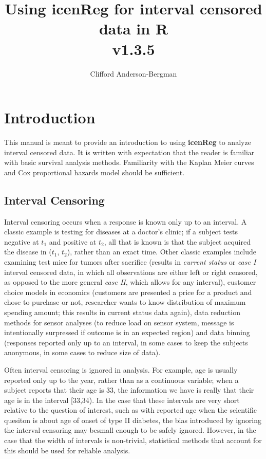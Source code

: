 \documentclass[a4paper]{article}
\begin{document}


\title{Using {\bf{icenReg}} for interval censored data in {\bf{R} } \\ v1.3.5}
\author{Clifford Anderson-Bergman}
\maketitle


\tableofcontents

\section{Introduction}

This manual is meant to provide an introduction to using {\bf icenReg} to analyze interval censored data. It is written with expectation that the reader is familiar with basic survival analysis methods. Familiarity with the Kaplan Meier curves and Cox proportional hazards model should be sufficient. 

\subsection{Interval Censoring}

Interval censoring occurs when a response is known only up to an interval. A classic example is testing for diseases at a doctor's clinic; if a subject tests negative at $t_1$ and positive at $t_2$, all that is known is that the subject acquired the disease in ($t_1$, $t_2$), rather than an exact time. Other classic examples include examining test mice for tumors after sacrifice (results in \emph{current status} or \emph{case I} interval censored data, in which all observations are either left or right censored, as opposed to the more general \emph{case II}, which allows for any interval), customer choice models in economics (customers are presented a price for a product and chose to purchase or not, researcher wants to know distribution of maximum spending amount; this results in current status data again), data reduction methods for sensor analyses (to reduce load on sensor system, message is intentionally surpressed if outcome is in an expected region) and data binning (responses reported only up to an interval, in some cases to keep the subjects anonymous, in some cases to reduce size of data). 

  
Often interval censoring is ignored in analysis. For example, age is usually reported only up to the year, rather than as a continuous variable; when a subject reports that their age is 33, the information we have is really that their age is in the interval [33,34). In the case that these intervals are very short relative to the question of interest, such as with reported age when the scientific quesiton is about age of onset of type II diabetes, the bias introduced by ignoring the interval censoring may besmall enough to be safely ignored. However, in the case that the width of intervals is non-trivial, statistical methods that account for this should be used for reliable analysis. 
  
\end{document}
